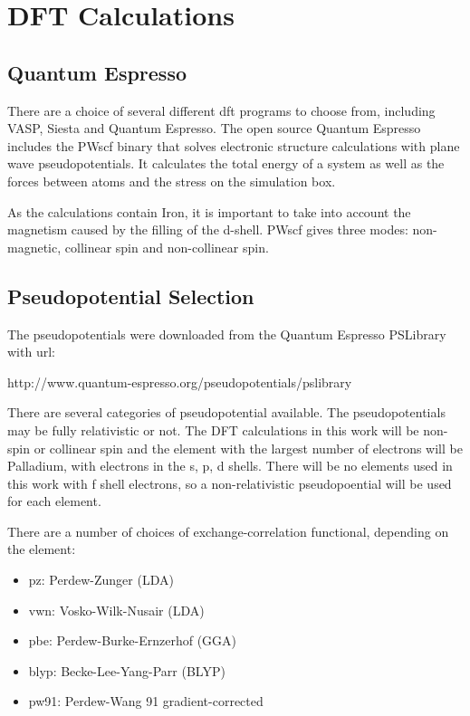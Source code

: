\section{DFT Calculations}


\subsection{Quantum Espresso}

There are a choice of several different \acrshort{dft} programs to choose from, including VASP, Siesta and Quantum Espresso.  The open source Quantum Espresso includes the PWscf binary that solves electronic structure calculations with plane wave pseudopotentials.  It calculates the total energy of a system as well as the forces between atoms and the stress on the simulation box.  

As the calculations contain Iron, it is important to take into account the magnetism caused by the filling of the d-shell.  PWscf gives three modes: non-magnetic, collinear spin and non-collinear spin.  



\subsection{Pseudopotential Selection}

The pseudopotentials were downloaded from the Quantum Espresso PSLibrary with url:

http://www.quantum-espresso.org/pseudopotentials/pslibrary 

There are several categories of pseudopotential available.  The pseudopotentials may be fully relativistic or not.  The DFT calculations in this work will be non-spin or collinear spin and the element with the largest number of electrons will be Palladium, with electrons in the s, p, d shells.  There will be no elements used in this work with f shell electrons, so a non-relativistic pseudopoential will be used for each element.

There are a number of choices of exchange-correlation functional, depending on the element:

\begin{itemize}
\item pz: Perdew-Zunger (LDA)
\item vwn: Vosko-Wilk-Nusair (LDA)
\item pbe: Perdew-Burke-Ernzerhof (GGA)
\item blyp: Becke-Lee-Yang-Parr (BLYP)
\item pw91: Perdew-Wang 91 gradient-corrected 
\end{itemize}

